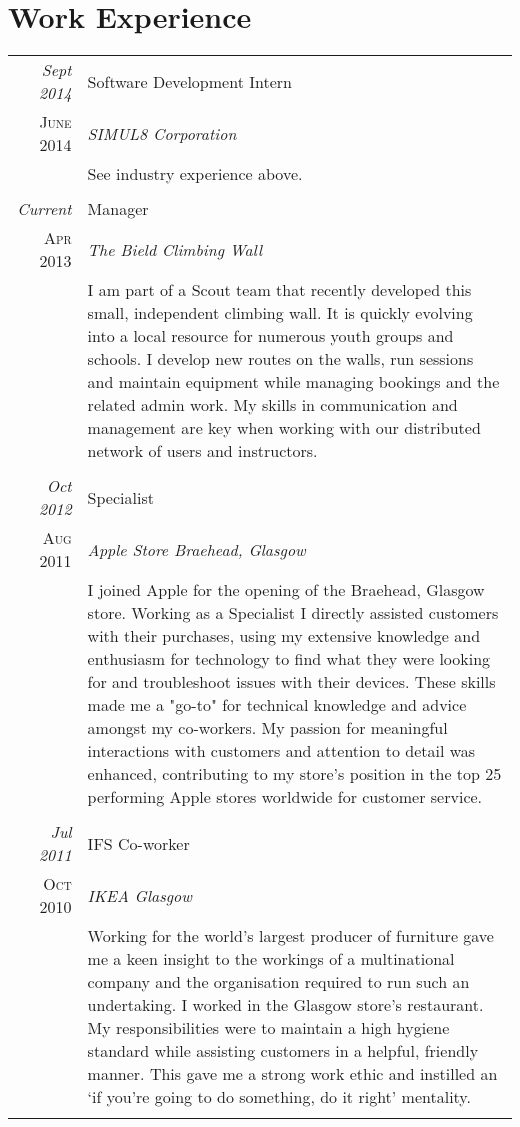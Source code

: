 \documentclass[a4paper,10pt]{article}
\begin{document}
\section{Work Experience}
\begin{longtable}{r|p{11cm}}
 \emph{Sept 2014} & Software Development Intern \\\textsc{June 2014}&\emph{SIMUL8 Corporation}\\&\footnotesize{See industry experience above.}\\\multicolumn{2}{c}{} \\
 \emph{Current} & Manager \\\textsc{Apr 2013}&\emph{The Bield Climbing Wall}\\&\footnotesize{I am part of a Scout team that recently developed this small, independent climbing wall. It is quickly evolving into a local resource for numerous youth groups and schools. I develop new routes on the walls, run sessions and maintain equipment while managing bookings and the related admin work. My skills in communication and management are key when working with our distributed network of users and instructors.}\\\multicolumn{2}{c}{} \\
 \emph{Oct 2012} & Specialist \\\textsc{Aug 2011}&\emph{Apple Store Braehead, Glasgow}\\&\footnotesize{I joined Apple for the opening of the Braehead, Glasgow store. Working as a Specialist I directly assisted customers with their purchases, using my extensive knowledge and enthusiasm for technology to find what they were looking for and troubleshoot issues with their devices. These skills made me a "go-to" for technical knowledge and advice amongst my co-workers. My passion for meaningful interactions with customers and attention to detail was enhanced, contributing to my store's position in the top 25 performing Apple stores worldwide for customer service.}\\\multicolumn{2}{c}{} \\
\pagebreak\emph{Jul 2011} & IFS Co-worker \\\textsc{Oct 2010}&\emph{IKEA Glasgow}\\&\footnotesize{Working for the world's largest producer of furniture gave me a keen insight to the workings of a multinational company and the organisation required to run such an undertaking. I worked in the Glasgow store’s restaurant. My responsibilities were to maintain a high hygiene standard while assisting customers in a helpful, friendly manner. This gave me a strong work ethic and instilled an ‘if you’re going to do something, do it right’ mentality.}\\\multicolumn{2}{c}{} \\
\end{longtable}
\end{document}
